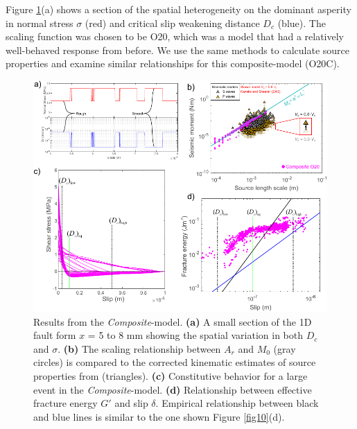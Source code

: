 \documentclass[preprint,1p, 10pt,authoryear]{elsarticle}
\begin{document}
Figure \ref{fig12}(a) shows a section of the spatial heterogeneity on the dominant asperity in normal stress $\sigma$ (red) and critical slip weakening distance $D_{c}$ (blue).  The scaling function was chosen to be O20, which was a model that had a relatively well-behaved response from before.  We use the same methods to calculate source properties and examine similar relationships for this composite-model (O20C).

\begin{figure}
	\centering
	\includegraphics{FIG12_revised.pdf} 
	\caption{Results from the \textit{Composite}-model. \textbf{(a)} A small section of the 1D fault form $x$ = 5 to 8 mm showing the spatial variation in both $D_{c}$ and $\sigma$. \textbf{(b)} The scaling relationship between $A_{r}$ and $M_{0}$ (gray circles) is compared to the corrected kinematic estimates of source properties from \citet{Selvadurai2019} (triangles).   \textbf{(c)} Constitutive behavior for a large event in the \textit{Composite}-model. \textbf{(d)} Relationship between effective fracture energy $G'$ and slip $\delta$. Empirical relationship between black and blue lines is similar to the one shown Figure \ref{fig10}(d).}
	\label{fig12}
\end{figure}
\end{document}
